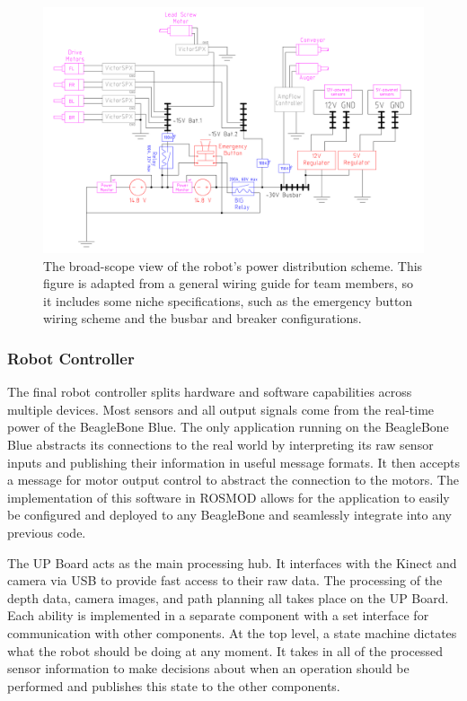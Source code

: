 \documentclass[class=article, crop=false]{standalone}
\begin{document}
	\FloatBarrier
	\begin{figure}[h]
	\centering
	 \includegraphics[width=1\linewidth]{09_Figures/power-distribution.jpg}
	 \caption{The broad-scope view of the robot’s power distribution scheme. This figure is adapted from a general wiring guide for team members, so it includes some niche specifications, such as the emergency button wiring scheme and the busbar and breaker configurations.}
	 \label{fig:power-dist}
	\end{figure}
	\FloatBarrier
	
	
	\subsubsection{Robot Controller}
	
	The final robot controller splits hardware and software capabilities across multiple devices. Most sensors and all output signals come from the real-time power of the BeagleBone Blue. The only application running on the BeagleBone Blue abstracts its connections to the real world by interpreting its raw sensor inputs and publishing their information in useful message formats. It then accepts a message for motor output control to abstract the connection to the motors. The implementation of this software in ROSMOD allows for the application to easily be configured and deployed to any BeagleBone and seamlessly integrate into any previous code.
	
	The UP Board acts as the main processing hub. It interfaces with the Kinect and camera via USB to provide fast access to their raw data. The processing of the depth data, camera images, and path planning all takes place on the UP Board. Each ability is implemented in a separate component with a set interface for communication with other components. At the top level, a state machine dictates what the robot should be doing at any moment. It takes in all of the processed sensor information to make decisions about when an operation should be performed and publishes this state to the other components.
	
\end{document}
